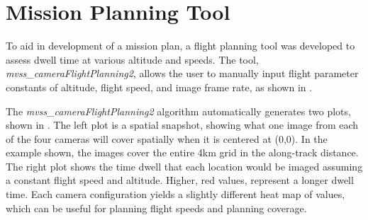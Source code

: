 	\section{Mission Planning Tool}
	To aid in development of a mission plan, a flight planning tool was developed to assess dwell time at various altitude and speeds.  The tool, \textit{mvss\_cameraFlightPlanning2}, allows the user to manually input flight parameter constants of altitude, flight speed, and image frame rate, as shown in .  
	
	
	
	The \textit{mvss\_cameraFlightPlanning2} algorithm automatically generates two plots, shown in .  The left plot is a spatial snapshot, showing what one image from each of the four cameras will cover spatially when it is centered at (0,0).  In the example shown, the images cover the entire 4km grid in the along-track distance.  The right plot shows the time dwell that each location would be imaged assuming a constant flight speed and altitude.  Higher, red values, represent a longer dwell time.  Each camera configuration yields a slightly different heat map of values, which can be useful for planning flight speeds and planning coverage.
		
